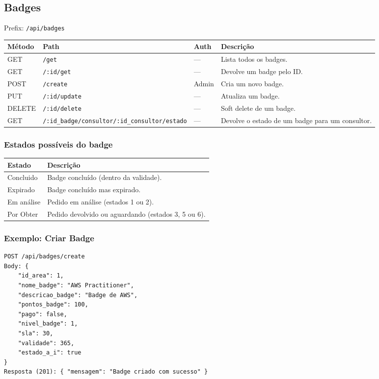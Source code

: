\documentclass[12pt,a4paper]{article}
\begin{document}
\subsection{Badges}
\label{sec:badges}

Prefix: \texttt{/api/badges}

\begin{longtable}{@{}lllp{6cm}@{}}
    \toprule
    \textbf{Método} & \textbf{Path} & \textbf{Auth} & \textbf{Descrição} \\
    \midrule
    \endhead
    \bottomrule
    \endfoot

    GET & \texttt{/get} & --- & Lista todos os badges. \\
    GET & \texttt{/:id/get} & --- & Devolve um badge pelo ID. \\
    POST & \texttt{/create} & Admin & Cria um novo badge. \\
    PUT & \texttt{/:id/update} & --- & Atualiza um badge. \\
    DELETE & \texttt{/:id/delete} & --- & Soft delete de um badge. \\
    GET & \texttt{/:id\_badge/consultor/:id\_consultor/estado} & --- & Devolve o estado de um badge para um consultor. \\
\end{longtable}

\subsubsection*{Estados possíveis do badge}
\begin{tabular}{ll}
    \toprule
    \textbf{Estado} & \textbf{Descrição} \\
    \midrule
    Concluido & Badge concluído (dentro da validade). \\
    Expirado  & Badge concluído mas expirado. \\
    Em análise & Pedido em análise (estados 1 ou 2). \\
    Por Obter & Pedido devolvido ou aguardando (estados 3, 5 ou 6). \\
    \bottomrule
\end{tabular}

\subsubsection*{Exemplo: Criar Badge}
\begin{lstlisting}
POST /api/badges/create
Body: {
    "id_area": 1,
    "nome_badge": "AWS Practitioner",
    "descricao_badge": "Badge de AWS",
    "pontos_badge": 100,
    "pago": false,
    "nivel_badge": 1,
    "sla": 30,
    "validade": 365,
    "estado_a_i": true
}
Resposta (201): { "mensagem": "Badge criado com sucesso" }
\end{lstlisting}
\end{document}
